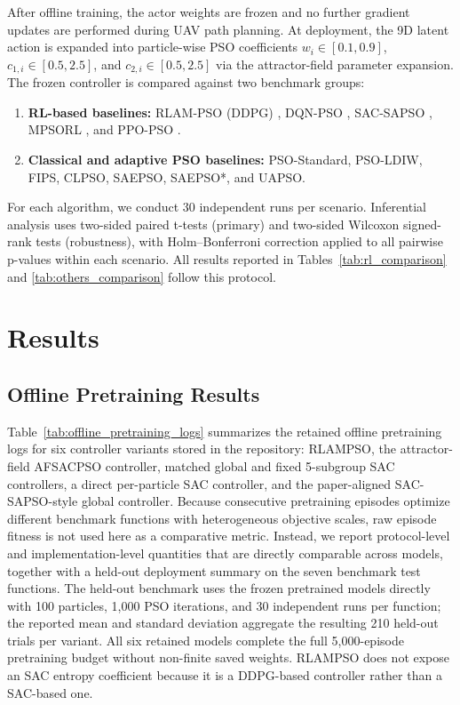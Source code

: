 \documentclass[final,5p,times]{elsarticle}
\begin{document}
After offline training, the actor weights are frozen and no further gradient updates are performed during UAV path planning.
At deployment, the 9D latent action is expanded into particle-wise PSO coefficients $w_{i} \in [0.1, 0.9]$, $c_{1,i} \in [0.5, 2.5]$, and $c_{2,i} \in [0.5, 2.5]$ via the attractor-field parameter expansion.
The frozen controller is compared against two benchmark groups:
\begin{enumerate}
    \item \textbf{RL-based baselines:} RLAM-PSO (DDPG) \cite{Yin2023RLAMPSO}, DQN-PSO \cite{Aoun2024Deep}, SAC-SAPSO \cite{vonEschwege2024Soft}, MPSORL \cite{Meng2023Multistrategy}, and PPO-PSO \cite{Klein2024Optimizing}.
    \item \textbf{Classical and adaptive PSO baselines:} PSO-Standard, PSO-LDIW, FIPS, CLPSO, SAEPSO, SAEPSO*, and UAPSO.
\end{enumerate}
For each algorithm, we conduct 30 independent runs per scenario.
Inferential analysis uses two-sided paired t-tests (primary) and two-sided Wilcoxon signed-rank tests (robustness), with Holm--Bonferroni correction applied to all pairwise p-values within each scenario.
All results reported in Tables~\ref{tab:rl_comparison} and \ref{tab:others_comparison} follow this protocol.




\section{Results}
\label{sec:results}

\subsection{Offline Pretraining Results}
Table~\ref{tab:offline_pretraining_logs} summarizes the retained offline pretraining logs for six controller variants stored in the repository: RLAMPSO, the attractor-field AFSACPSO controller, matched global and fixed 5-subgroup SAC controllers, a direct per-particle SAC controller, and the paper-aligned SAC-SAPSO-style global controller.
Because consecutive pretraining episodes optimize different benchmark functions with heterogeneous objective scales, raw episode fitness is not used here as a comparative metric.
Instead, we report protocol-level and implementation-level quantities that are directly comparable across models, together with a held-out deployment summary on the seven benchmark test functions.
The held-out benchmark uses the frozen pretrained models directly with 100 particles, 1{,}000 PSO iterations, and 30 independent runs per function; the reported mean and standard deviation aggregate the resulting 210 held-out trials per variant.
All six retained models complete the full 5{,}000-episode pretraining budget without non-finite saved weights. RLAMPSO does not expose an SAC entropy coefficient because it is a DDPG-based controller rather than a SAC-based one.
\end{document}
